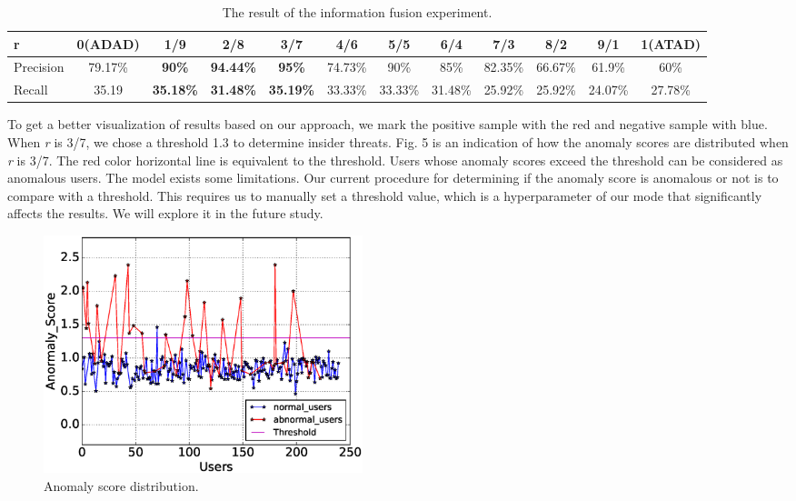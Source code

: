 \documentclass[conference]{IEEEtran}
\begin{document}
\begin{table}[tbp]
\caption{The result of the information fusion experiment.}
\centering  %
\begin{tabular}{lccccccccccc}  %
\hline
r &0(ADAD)&\textbf{1/9} &\textbf{2/8} &\textbf{3/7} &4/6 &5/5 &6/4 &7/3 &8/2 &9/1 &1(ATAD)\\\hline

Precision &79.17\% &\textbf{90\%} &\textbf{94.44\%} &\textbf{95\%}&74.73\%&90\%  &85\% &82.35\% &66.67\%&61.9\%&60\% \\\hline

Recall &35.19 &\textbf{35.18\%} &\textbf{31.48\%} &\textbf{35.19\%}&33.33\%&33.33\%&31.48\%&25.92\%&25.92\%&24.07\%&27.78\%\\\hline
\end{tabular}

\end{table}

To get a better visualization of results based on our approach, we mark the positive sample with the red and negative sample with blue. 
When \emph{r} is 3/7, we chose a threshold 1.3 to determine insider threats.
Fig. 5 is an indication of how the anomaly scores are distributed when \emph{r} is 3/7. 
The red color horizontal line is equivalent to the threshold.
Users whose anomaly scores exceed the threshold can be considered as anomalous users. The model exists some limitations. Our current procedure for determining if the
anomaly score is anomalous or not is to compare with a threshold. This requires us to manually set a threshold value, which is a hyperparameter of our mode that significantly affects the results. 
We will explore it in the future study. 

\begin{figure}[htb]
\centerline{\includegraphics[width = 0.45\textwidth]{figure/figure8.eps}}
\caption{Anomaly score distribution.}
\label{fig}
\end{figure}
\end{document}

